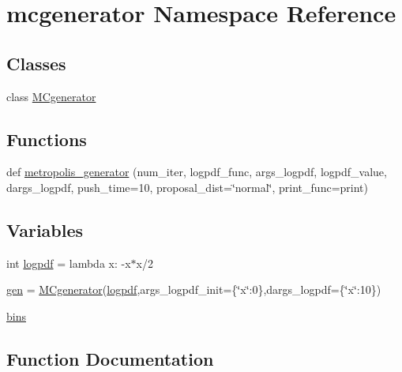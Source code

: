 \hypertarget{namespacemcgenerator}{}\section{mcgenerator Namespace Reference}
\label{namespacemcgenerator}
\subsection*{Classes}
\begin{DoxyCompactItemize}
\item 
class \hyperlink{classmcgenerator_1_1MCgenerator}{M\+Cgenerator}
\end{DoxyCompactItemize}
\subsection*{Functions}
\begin{DoxyCompactItemize}
\item 
def \hyperlink{namespacemcgenerator_a8f55af530516085f0a5169e130a9b35b}{metropolis\+\_\+generator} (num\+\_\+iter, logpdf\+\_\+func, args\+\_\+logpdf, logpdf\+\_\+value, dargs\+\_\+logpdf, push\+\_\+time=10, proposal\+\_\+dist=\char`\"{}normal\char`\"{}, print\+\_\+func=print)
\end{DoxyCompactItemize}
\subsection*{Variables}
\begin{DoxyCompactItemize}
\item 
int \hyperlink{namespacemcgenerator_a23bb8cafe013a76952e0a2e881d28c5a}{logpdf} = lambda x\+: -\/x$\ast$x/2
\item 
\hyperlink{namespacemcgenerator_aa96e25cd8bcb93136f1b355b2b9fefa8}{gen} = \hyperlink{classmcgenerator_1_1MCgenerator}{M\+Cgenerator}(\hyperlink{namespacemcgenerator_a23bb8cafe013a76952e0a2e881d28c5a}{logpdf},args\+\_\+logpdf\+\_\+init=\{\char`\"{}x\char`\"{}\+:0\},dargs\+\_\+logpdf=\{\char`\"{}x\char`\"{}\+:10\})
\item 
\hyperlink{namespacemcgenerator_a3b26217311f64965e346b0ce0e83680b}{bins}
\end{DoxyCompactItemize}


\subsection{Function Documentation}
\mbox{\label{namespacemcgenerator_a8f55af530516085f0a5169e130a9b35b}} 
